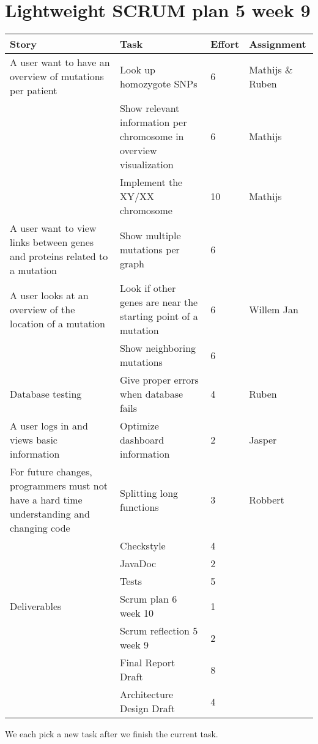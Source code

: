 \documentclass[a4paper]{report}
\begin{document}


\section*{Lightweight SCRUM plan 5 week 9}

\setlength\extrarowheight{5pt}
\begin{table}[ht]
\begin{tabular}{p{5cm}|p{5cm}|p{1cm}|p{2cm}}

\textbf{Story} & \textbf{Task} & \textbf{Effort} & \textbf{Assignment}\\
\hline \hline

A user want to have an overview of mutations per patient
& Look up homozygote SNPs & 6 & Mathijs \& Ruben\\
& Show relevant information per chromosome in overview visualization & 6 & Mathijs\\
& Implement the XY/XX chromosome & 10 & Mathijs\\
\hline

A user want to view links between genes and proteins related to a mutation 
& Show multiple mutations per graph & 6 & \\
\hline

A user looks at an overview of the location of a mutation 
& Look if other genes are near the starting point of a mutation & 6 & Willem Jan\\
& Show neighboring mutations & 6 &\\
\hline

Database testing 
& Give proper errors when database fails & 4 & Ruben\\
\hline

A user logs in and views basic information 
& Optimize dashboard information & 2 & Jasper\\
\hline

For future changes, programmers must not have a hard time understanding and changing code
& Splitting long functions & 3 & Robbert \\
& Checkstyle & 4 & \\
& JavaDoc & 2 & \\
& Tests & 5 & \\
\hline

Deliverables 
& Scrum plan 6 week 10 & 1 &\\
& Scrum reflection 5 week 9 & 2 &\\
& Final Report Draft & 8 &\\
& Architecture Design Draft & 4 &\\
\hline
\end{tabular}
\end{table}

We each pick a new task after we finish the current task.
\end{document}
